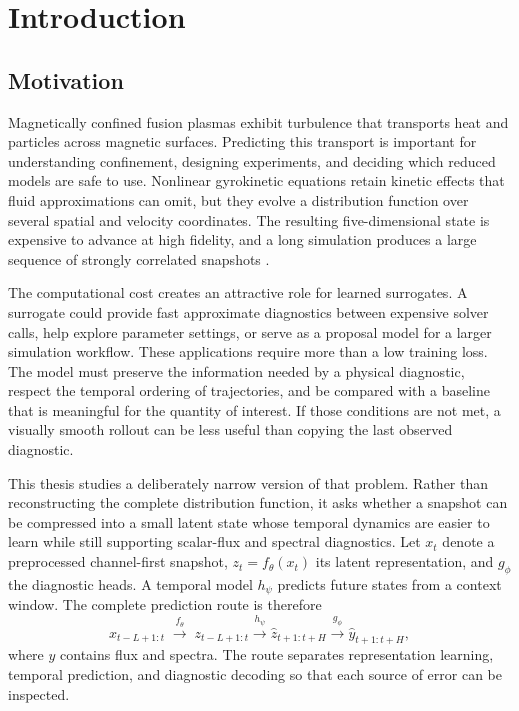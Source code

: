 \cleardoubleoddpage
\chapter{Introduction}
\label{chap:introduction}

\section{Motivation}

Magnetically confined fusion plasmas exhibit turbulence that transports heat and particles across
magnetic surfaces. Predicting this transport is important for understanding confinement, designing
experiments, and deciding which reduced models are safe to use. Nonlinear gyrokinetic equations
retain kinetic effects that fluid approximations can omit, but they evolve a distribution function
over several spatial and velocity coordinates. The resulting five-dimensional state is expensive to
advance at high fidelity, and a long simulation produces a large sequence of strongly correlated
snapshots \citep{abel2013multiscale,paischer2025gyroswin}.

The computational cost creates an attractive role for learned surrogates. A surrogate could provide
fast approximate diagnostics between expensive solver calls, help explore parameter settings, or
serve as a proposal model for a larger simulation workflow. These applications require more than a
low training loss. The model must preserve the information needed by a physical diagnostic, respect
the temporal ordering of trajectories, and be compared with a baseline that is meaningful for the
quantity of interest. If those conditions are not met, a visually smooth rollout can be less useful
than copying the last observed diagnostic.

This thesis studies a deliberately narrow version of that problem. Rather than reconstructing the
complete distribution function, it asks whether a snapshot can be compressed into a small latent
state whose temporal dynamics are easier to learn while still supporting scalar-flux and spectral
diagnostics. Let $x_t$ denote a preprocessed channel-first snapshot, $z_t=f_\theta(x_t)$ its
latent representation, and $g_\phi$ the diagnostic heads. A temporal model $h_\psi$ predicts future
states from a context window. The complete prediction route is therefore
\begin{equation}
  x_{t-L+1:t}\;\xrightarrow{f_\theta}\;z_{t-L+1:t}
  \xrightarrow{h_\psi}\widehat{z}_{t+1:t+H}
  \xrightarrow{g_\phi}\widehat{y}_{t+1:t+H},
\end{equation}
where $y$ contains flux and spectra. The route separates representation learning, temporal
prediction, and diagnostic decoding so that each source of error can be inspected.

